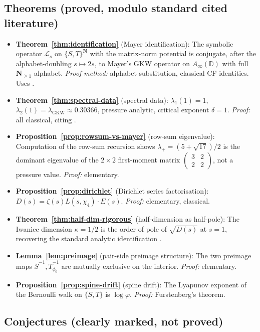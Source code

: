 ﻿\documentclass[11pt]{article}
\theoremstyle{definition}
\newcommand{\N}{\mathbf{N}}
\newcommand{\Sb}{\bar{S}}
\newcommand{\Tb}{\bar{T}_{\phi_0}}
\newcommand{\Lop}{\mathcal{L}}
\newcommand{\GKW}{\mathrm{GKW}}
\begin{document}
\subsection{Theorems (proved, modulo standard cited literature)}

\begin{itemize}
\item \textbf{Theorem~\ref{thm:identification}} (Mayer identification): The symbolic operator $\Lop_s$ on $\{S,T\}^\N$ with the matrix-norm potential is conjugate, after the alphabet-doubling $s\mapsto 2s$, to Mayer's GKW operator on $A_\infty(\mathbb{D})$ with full $\N_{\ge 1}$ alphabet. \emph{Proof method:} alphabet substitution, classical CF identities. Uses \cite{mayer,khinchin}.
\item \textbf{Theorem~\ref{thm:spectral-data}} (spectral data): $\lambda_1(1)=1$, $\lambda_2(1)=\lambda_\GKW\approx 0.30366$, pressure analytic, critical exponent $\delta=1$. \emph{Proof:} all classical, citing \cite{wirsing,mayer-roepstorff,pollicott-vytnova,jenkinson-pollicott}.
\item \textbf{Proposition~\ref{prop:rowsum-vs-mayer}} (row-sum eigenvalue): Computation of the row-sum recursion shows $\lambda_+=(5+\sqrt{17})/2$ is the dominant eigenvalue of the $2\times 2$ first-moment matrix $\begin{pmatrix}3&2\\2&2\end{pmatrix}$, not a pressure value. \emph{Proof:} elementary.
\item \textbf{Proposition~\ref{prop:dirichlet}} (Dirichlet series factorisation): $D(s)=\zeta(s)L(s,\chi_4)\cdot E(s)$. \emph{Proof:} elementary, classical.
\item \textbf{Theorem~\ref{thm:half-dim-rigorous}} (half-dimension as half-pole): The Iwaniec dimension $\kappa=1/2$ is the order of pole of $\sqrt{D(s)}$ at $s=1$, recovering the standard analytic identification \cite{iwaniec1976}.
\item \textbf{Lemma~\ref{lem:preimage}} (pair-side preimage structure): The two preimage maps $\Sb^{-1},\Tb^{-1}$ are mutually exclusive on the interior. \emph{Proof:} elementary.
\item \textbf{Proposition~\ref{prop:spine-drift}} (spine drift): The Lyapunov exponent of the Bernoulli walk on $\{S,T\}$ is $\log\varphi$. \emph{Proof:} Furstenberg's theorem.
\end{itemize}

\subsection{Conjectures (clearly marked, not proved)}
\end{document}
